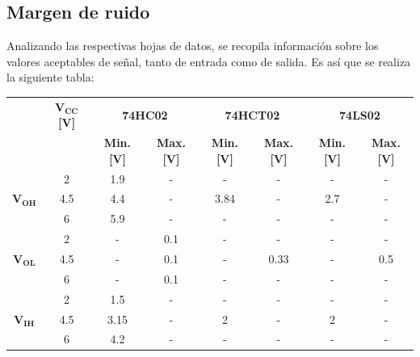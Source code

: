 \subsection{Margen de ruido}
Analizando las respectivas hojas de datos, se recopila información sobre los  valores aceptables de señal, tanto de entrada como de salida. Es así que se realiza la siguiente tabla:
\begin{table}[H]
\centering
\begin{tabular}{c|c|c|c|c|c|c|c|}
\cline{2-8}
                               & $\mathbf{V_{CC}}$ \textbf{[V]} & \multicolumn{2}{c|}{\textbf{74HC02}}  & \multicolumn{2}{c|}{\textbf{74HCT02}} & \multicolumn{2}{c|}{\textbf{74LS02}} \\ \cline{3-8} 
                               &              & \textbf{Min. [V]} & \textbf{Max. [V]} & \textbf{Min. [V]} & \textbf{Max. [V]} & \textbf{Min. [V]} & \textbf{Max. [V]}	\\ \hline
\multicolumn{1}{|c|}{}         & 2            & 1.9           & -            & -             & -            & -          & -            \\  
\multicolumn{1}{|c|}{$\mathbf{V_{OH}}$} & 4.5          & 4.4           & -            & 3.84          & -            & 2.7            & -            \\  
\multicolumn{1}{|c|}{}         & 6            & 5.9           & -            & -             & -            & -            & -            \\ \hline
\multicolumn{1}{|c|}{}         & 2            & -             & 0.1          & -             & -            & -            & -          \\
\multicolumn{1}{|c|}{$\mathbf{V_{OL}}$} & 4.5          & -             & 0.1          & -             & 0.33         & -            & 0.5            \\
\multicolumn{1}{|c|}{}         & 6            & -             & 0.1          & -             & -            & -            & -            \\ \hline
\multicolumn{1}{|c|}{}         & 2            & 1.5           & -            & -             & -            & -            & -            \\ 
\multicolumn{1}{|c|}{$\mathbf{V_{IH}}$}  & 4.5          & 3.15          & -            & 2             & -            & 2            & -            \\ 
\multicolumn{1}{|c|}{}         & 6            & 4.2           & -            & -             & -            & -            & -            \\ \hline

\end{tabular}
\end{table}
